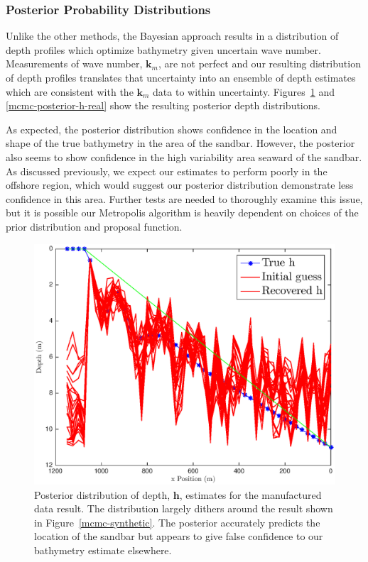 \subsubsection{Posterior Probability Distributions}

Unlike the other methods, the Bayesian approach results in a distribution of depth profiles which optimize bathymetry given uncertain wave number. Measurements of wave number, $\mathbf{k}_m$, are not perfect and our resulting distribution of depth profiles translates that uncertainty into an ensemble of depth estimates which are consistent with the $\mathbf{k}_m$ data to within uncertainty. Figures~\ref{mcmc-posterior-h-synthetic} and \ref{mcmc-posterior-h-real} show the resulting posterior depth distributions. 

As expected, the posterior distribution shows confidence in the location and shape of the true bathymetry in the area of the sandbar. However, the posterior also seems to show confidence in the high variability area seaward of the sandbar. As discussed previously, we expect our estimates to perform poorly in the offshore region, which would suggest our posterior distribution demonstrate less confidence in this area. Further tests are needed to thoroughly examine this issue, but it is possible our Metropolis algorithm is heavily dependent on choices of the prior distribution and proposal function. 


\begin{figure}[H]
\center
\includegraphics[scale=0.46]{img/MCMC-posterior-manufactured}
\caption{Posterior distribution of depth, $\mathbf{h}$, estimates for the manufactured data result. The distribution largely dithers around the result shown in Figure~\ref{mcmc-synthetic}. The posterior accurately predicts the location of the sandbar but appears to give false confidence to our bathymetry estimate elsewhere.}
\label{mcmc-posterior-h-synthetic}
\end{figure}





